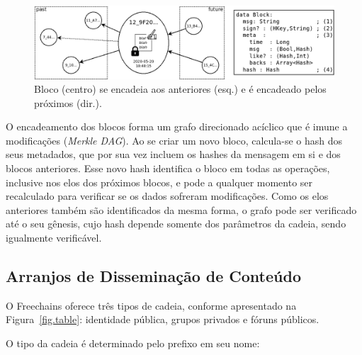 \documentclass[12pt]{article}
\newcommand{\FC} {Freechains\xspace}
\newcommand{\Xon} {$1{\rightarrow}N$\xspace}
\newcommand{\Xno} {$1{\leftarrow}N$\xspace}
\newcommand{\Xnn} {$N{\leftrightarrow}N$\xspace}
\newcommand{\Xoo} {$1{\leftrightarrow}1$\xspace}
\newcommand{\Xo}  {$1{\hookleftarrow}$\xspace}
\begin{document}
\begin{figure}[ht]
\centering
\includegraphics[width=.90\textwidth]{block1.png}
\caption{\scriptsize{Bloco (centro) se encadeia aos anteriores (esq.) e é encadeado
         pelos próximos (dir.).}}
\label{fig.block}
\end{figure}

O encadeamento dos blocos forma um grafo direcionado acíclico que é imune a
modificações (\emph{Merkle DAG}).
Ao se criar um novo bloco, calcula-se o hash dos seus metadados, que por sua
vez incluem os hashes da mensagem em si e dos blocos anteriores.
Esse novo hash identifica o bloco em todas as operações, inclusive nos elos dos
próximos blocos, e pode a qualquer momento ser recalculado para verificar se os
dados sofreram modificações.
Como os elos anteriores também são identificados da mesma forma, o grafo pode
ser verificado até o seu gênesis, cujo hash depende somente dos parâmetros da
cadeia, sendo igualmente verificável.

\subsection{Arranjos de Disseminação de Conteúdo}

O \FC oferece três tipos de cadeia, conforme apresentado na
Figura~\ref{fig.table}: identidade pública, grupos privados e fóruns públicos.
%

%
O tipo da cadeia é determinado pelo prefixo em seu nome:
\end{document}
